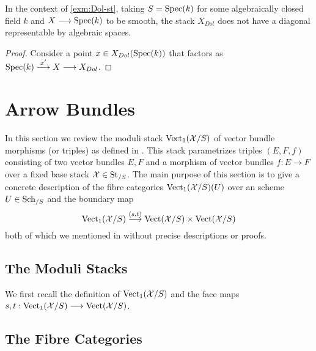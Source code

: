 \documentclass[11pt]{amsart}
\begin{document}
\begin{prop}\label{prop:Dol-st-diag-non-rep}
In the context of \cref{exm:Dol-st}, taking $S = \mathrm{Spec}(k)$ for some
algebraically closed field $k$ and $X \to \Spec(k)$ to be smooth,
the stack $X_{Dol}$ does not have a diagonal representable by algebraic spaces.
\end{prop}
\begin{proof}
Consider a point $x \in X_{Dol}(\mathrm{Spec}(k))$ that factors as
$\Spec(k) \to[x'] X \to X_{Dol}$.
\end{proof}

\section{Arrow Bundles}

In this section we review the moduli stack $\mathrm{Vect}_1(\mathcal{X}/S)$ of vector bundle
morphisms (or triples) as defined in \cite[\S 3]{ModQuivBun}.
This stack parametrizes triples $(E, F, f)$ consisting of two vector bundles
$E, F$ and a morphism of vector bundles $f : E \to F$ over a fixed base stack
$\mathcal{X} \in \mathrm{St}_{/S}$. The main purpose of this section is to give a concrete
description of the fibre categories $\mathrm{Vect}_1(\mathcal{X}/S)(U)$ over an scheme
$U \in \mathrm{Sch}_{/S}$ and the boundary map
\[
\Vect_1(\mcX/S) \to[{(s, t)}] \Vect(\mcX/S) \times \Vect(\mcX/S)
\]
both of which we mentioned in \cite{ModQuivBun} without precise descriptions
or proofs.

\subsection{The Moduli Stacks}

We first recall the definition of $\mathrm{Vect}_1(\mathcal{X}/S)$ and the face maps
$s, t : \Vect_1(\mcX/S) \to \Vect(\mcX/S)$.

\subsection{The Fibre Categories}
\end{document}
